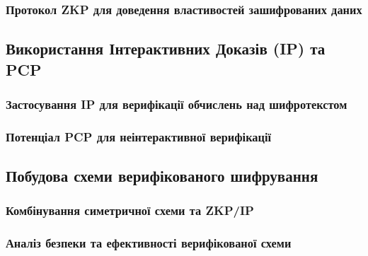 \documentclass[a4paper,12pt]{article}
\begin{document}
    \subsubsection{Протокол ZKP для доведення властивостей зашифрованих даних} %

    \subsection{Використання Інтерактивних Доказів (IP) та PCP} %

    \subsubsection{Застосування IP для верифікації обчислень над шифротекстом} %

    \subsubsection{Потенціал PCP для неінтерактивної верифікації} %

    \subsection{Побудова схеми верифікованого шифрування} %

    \subsubsection{Комбінування симетричної схеми та ZKP/IP} %

    \subsubsection{Аналіз безпеки та ефективності верифікованої схеми} %
\end{document}

